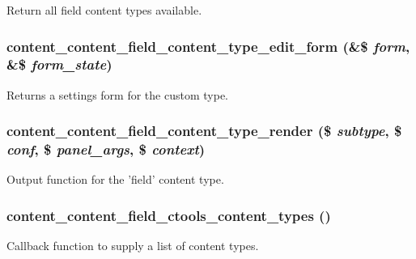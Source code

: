 Return all field content types available. \hypertarget{content__field_8inc_977a3ade87db904419cc1c2230a57e25}{
\subsubsection[{content\_\-content\_\-field\_\-content\_\-type\_\-edit\_\-form}]{\setlength{\rightskip}{0pt plus 5cm}content\_\-content\_\-field\_\-content\_\-type\_\-edit\_\-form (\&\$ {\em form}, \/  \&\$ {\em form\_\-state})}}
\label{content__field_8inc_977a3ade87db904419cc1c2230a57e25}


Returns a settings form for the custom type. \hypertarget{content__field_8inc_979d19ca8a7bbc19224856d4f97a733b}{
\subsubsection[{content\_\-content\_\-field\_\-content\_\-type\_\-render}]{\setlength{\rightskip}{0pt plus 5cm}content\_\-content\_\-field\_\-content\_\-type\_\-render (\$ {\em subtype}, \/  \$ {\em conf}, \/  \$ {\em panel\_\-args}, \/  \$ {\em context})}}
\label{content__field_8inc_979d19ca8a7bbc19224856d4f97a733b}


Output function for the 'field' content type. \hypertarget{content__field_8inc_eccf10c30b3cac5fdc4e7cf6edd832fd}{
\subsubsection[{content\_\-content\_\-field\_\-ctools\_\-content\_\-types}]{\setlength{\rightskip}{0pt plus 5cm}content\_\-content\_\-field\_\-ctools\_\-content\_\-types ()}}
\label{content__field_8inc_eccf10c30b3cac5fdc4e7cf6edd832fd}


Callback function to supply a list of content types. 